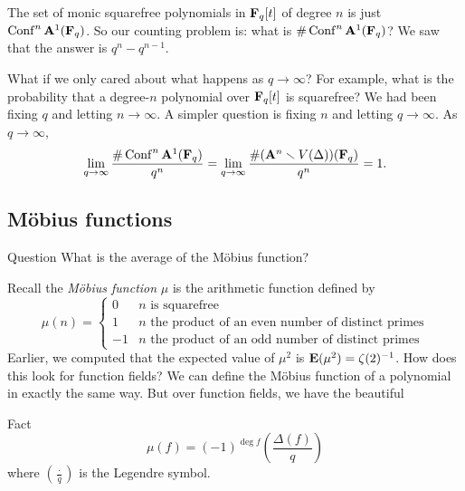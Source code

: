 The set of monic squarefree polynomials in $\mathbf{F}_q[t]$ of degree $n$ is just 
$\operatorname{Conf}^n\mathbf{A}^1(\mathbf{F}_q)$. So our counting problem is: what is 
$\#\operatorname{Conf}^n\mathbf{A}^1(\mathbf{F}_q)$? We saw that the answer is $q^n-q^{n-1}$. 

What if we only cared about what happens as $q\to \infty$? For example, what is 
the probability that a degree-$n$ polynomial over $\mathbf{F}_q[t]$ is squarefree? We 
had been fixing $q$ and letting $n\to \infty$. A simpler question is fixing $n$ 
and letting $q\to \infty$. As $q\to \infty$, 
\[
  \lim_{q\to\infty}\frac{\#\operatorname{Conf}^n\mathbf{A}^1(\mathbf{F}_q)}{q^n} 
    = \lim_{q\to \infty}\frac{\#(\mathbf{A}^n\smallsetminus V(\Delta))(\mathbf{F}_q)}{q^n} 
    = 1 .
\]





\subsection{M\"obius functions}

\begin{enonce}{Question}
What is the average of the M\"obius function?
\end{enonce}

Recall the \emph{M\"obius function} $\mu$ is the arithmetic function defined by 
\[
  \mu(n) = \begin{cases} 0 & n\text{ is squarefree} \\ 1 & n\text{ the product of an even number of distinct primes} \\ -1 & n\text{ the product of an odd number of distinct primes} \end{cases}
\]
Earlier, we computed that the expected value of $\mu^2$ is 
$\operatorname{\mathbf{E}}(\mu^2)=\zeta(2)^{-1}$. How does this look for function fields? We 
can define the M\"obius function of a polynomial in exactly the same way. But 
over function fields, we have the beautiful 

\begin{enonce}{Fact}
\[
  \mu(f) = (-1)^{\deg f} \left(\frac{\Delta(f)}{q}\right) 
\]
where $\left(\frac{\cdot}{q}\right)$ is the Legendre symbol. 
\end{enonce}

